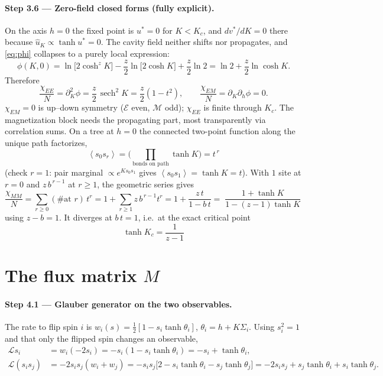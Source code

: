 \documentclass[11pt]{article}
\newcommand{\sech}{\operatorname{sech}}
\newcommand{\eq}{\mathcal{E}}
\newcommand{\mg}{\mathcal{M}}
\newcommand{\LL}{\mathcal{L}}
\newcommand{\avg}[1]{\left\langle #1 \right\rangle}
\newcommand{\Sig}{\Sigma}
\newcommand{\half}{\tfrac12}
\begin{document}
\paragraph{Step 3.6 --- Zero-field closed forms (fully explicit).}
On the axis $h=0$ the fixed point is $u^*=0$ for $K<K_c$, and $dv^*/dK=0$ there because
$\hat u_K\propto\tanh u^*=0$. The cavity field neither shifts nor propagates, and \eqref{eq:phi}
collapses to a purely local expression:
\begin{equation}
\phi(K,0)=\ln\big[2\cosh^{z}K\big]-\frac z2\ln\big[2\cosh K\big]+\frac z2\ln2
=\ln2+\frac z2\ln\cosh K .
\end{equation}
Therefore
\begin{equation}
\frac{\chi_{EE}}N=\partial_K^2\phi=\frac z2\,\sech^2K=\frac z2(1-t^2),
\qquad
\frac{\chi_{EM}}N=\partial_K\partial_h\phi=0 .
\end{equation}
$\chi_{EM}=0$ is up--down symmetry ($\eq$ even, $\mg$ odd); $\chi_{EE}$ is finite through $K_c$.
The magnetization block needs the propagating part, most transparently via correlation sums. On a
tree at $h=0$ the connected two-point function along the unique path factorizes,
\begin{equation}
\avg{s_0 s_r}=\Big(\prod_{\text{bonds on path}}\tanh K\Big)=t^{\,r}
\end{equation}
(check $r=1$: pair marginal $\propto e^{Ks_0s_1}$ gives $\avg{s_0s_1}=\tanh K=t$). With
$1$ site at $r=0$ and $z\,b^{\,r-1}$ at $r\ge1$, the geometric series gives
\begin{equation}
\frac{\chi_{MM}}N=\sum_{r\ge0}(\#\text{at }r)\,t^{r}
=1+\sum_{r\ge1}z\,b^{\,r-1}t^{r}
=1+\frac{z\,t}{1-b\,t}
=\boxed{\;\frac{1+\tanh K}{1-(z-1)\tanh K}\;}
\end{equation}
using $z-b=1$. It diverges at $b\,t=1$, i.e.\ at the exact critical point
\begin{equation}
\boxed{\;\tanh K_c=\frac1{z-1}\;}
\end{equation}

\section{The flux matrix \texorpdfstring{$M$}{M}}

\paragraph{Step 4.1 --- Glauber generator on the two observables.}
The rate to flip spin $i$ is $w_i(s)=\half[1-s_i\tanh\theta_i]$, $\theta_i=h+K\Sig_i$. Using $s_i^2=1$
and that only the flipped spin changes an observable,
\begin{align}
\LL s_i&=w_i(-2s_i)=-s_i(1-s_i\tanh\theta_i)=-s_i+\tanh\theta_i,
\tag{6a}\label{eq:Lsi}\\[2pt]
\LL(s_is_j)&=-2s_is_j(w_i+w_j)
=-s_is_j\big[2-s_i\tanh\theta_i-s_j\tanh\theta_j\big]
=-2s_is_j+s_j\tanh\theta_i+s_i\tanh\theta_j .
\tag{6b}\label{eq:Lsisj}
\end{align}
\end{document}
